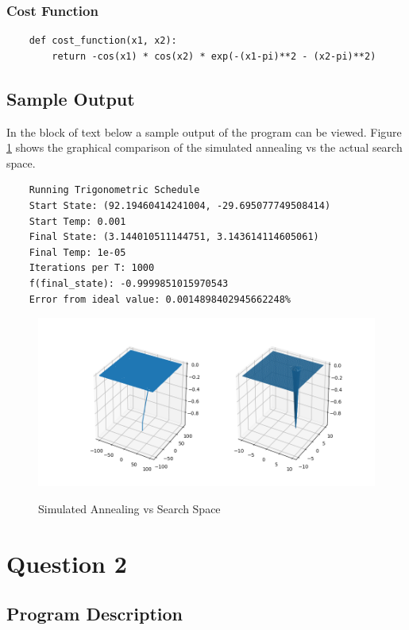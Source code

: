 \documentclass{article}
\begin{document}
\subsubsection{Cost Function}
\begin{lstlisting}
    def cost_function(x1, x2):
        return -cos(x1) * cos(x2) * exp(-(x1-pi)**2 - (x2-pi)**2)
\end{lstlisting}

\subsection{Sample Output}
In the block of text below a sample output of the program can be viewed.
Figure \ref{fig:q1} shows the graphical comparison of the simulated annealing vs the actual search space.
\begin{lstlisting}
    Running Trigonometric Schedule
    Start State: (92.19460414241004, -29.695077749508414)
    Start Temp: 0.001
    Final State: (3.144010511144751, 3.143614114605061)
    Final Temp: 1e-05
    Iterations per T: 1000
    f(final_state): -0.9999851015970543
    Error from ideal value: 0.0014898402945662248%
\end{lstlisting}
\begin{figure}
    \centering
    {\label{fig:q1}\includegraphics[scale=0.5]{q1.png}}
    \caption{Simulated Annealing vs Search Space}
\end{figure}

\newpage
\section{Question 2}

\subsection{Program Description}
\end{document}
